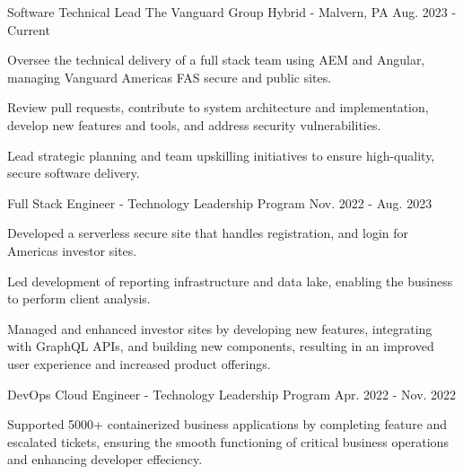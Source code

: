 

\begin{cventries}
  \cventry
    {Software Technical Lead} %
    {The Vanguard Group} %
    {Hybrid - Malvern, PA} %
    {Aug. 2023 - Current} %
    {
      \begin{cvitems} %
        \item {Oversee the technical delivery of a full stack team using AEM and Angular, managing Vanguard Americas FAS secure and public sites.}
        \item {Review pull requests, contribute to system architecture and implementation, develop new features and tools, and address security vulnerabilities.}
        \item {Lead strategic planning and team upskilling initiatives to ensure high-quality, secure software delivery.}
      \end{cvitems}
    }
  \cventry
    {Full Stack Engineer - Technology Leadership Program} %
    {} %
    {} %
    {Nov. 2022 - Aug. 2023} %
    {
      \begin{cvitems} %
        \item {Developed a serverless secure site that handles registration, and login for Americas investor sites.}
        \item {Led development of reporting infrastructure and data lake, enabling the business to perform client analysis.}
        \item {Managed and enhanced investor sites by developing new features, integrating with GraphQL APIs, and building new components, resulting in an improved user experience and increased product offerings.}
      \end{cvitems}
    }
  \cventry
    {DevOps Cloud Engineer - Technology Leadership Program} %
    {} %
    {} %
    {Apr. 2022 - Nov. 2022} %
    {
      \begin{cvitems} %
        \item {Supported 5000+ containerized business applications by completing feature and escalated tickets, ensuring the smooth functioning of critical business operations and enhancing developer effeciency.}

\end{cvitems}}
\end{cventries}
